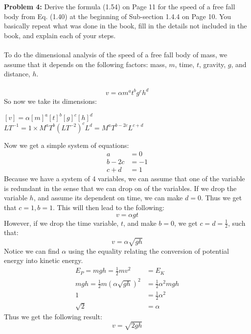 \documentclass[11pt]{article}
\newenvironment{problem}[1]{\textbf{Problem #1: }}{\newpage}
\begin{document}
	\begin{problem}{4}
		Derive the formula (1.54) on Page 11 for the speed of a free fall body from Eq. (1.40) at
		the beginning of Sub-section 1.4.4 on Page 10. You basically repeat what was done in the
		book, fill in the details not included in the book, and explain each of your steps. 
		\\ \\
		To do the dimensional analysis of the speed of a free fall body of mass, we assume that it depends on the following factors: mass, $m$, time, $t$, gravity, $g$, and distance, $h$.
		\\ \\
		\[v = \alpha m^a t^b g^c h^d\]
		So now we take its dimensions:
		\begin{center}
			$[v] = \alpha [m]^a[t]^b[g]^c[h]^d$ \\
			\vspace{.2cm}
			$LT^{-1} = 1 \times M^a T^b (LT^{-2})^c L^d = M^a T^{b-2c}L^{c+d}$
		\end{center} 
		Now we get a simple system of equations:
		\begin{align*}
			a &= 0 \\
			b - 2c &= -1 \\
			c + d &= 1
		\end{align*}
		Because we have a system of 4 variables, we can assume that one of the variable is redundant in the sense that we can drop on of the variables.  If we drop the variable $h$, and assume its dependent on time, we can make $d = 0$.  Thus we get that $c = 1, b = 1$.  This will then lead to the following:
		\[v = \alpha gt \]
		However, if we drop the time variable, $t$, and make $b = 0$, we get $c = d = \frac{1}{2}$, such that:
		\[v = \alpha\sqrt{gh}\] 
		Notice we can find $\alpha$ using the equality relating the conversion of potential energy into kinetic energy.
		\begin{align*}
			E_P = mgh = \frac{1}{2}mv^2 &= E_K \\
			mgh = \frac{1}{2}m(\alpha \sqrt{gh})^2 &= \frac{1}{2}\alpha^2 mgh \\
			1 &= \frac{1}{2}\alpha^2 \\
			\sqrt{2} &= \alpha 
		\end{align*}  
		Thus we get the following result:
		\[v = \sqrt{2gh}\]
	\end{problem}
\end{document}
